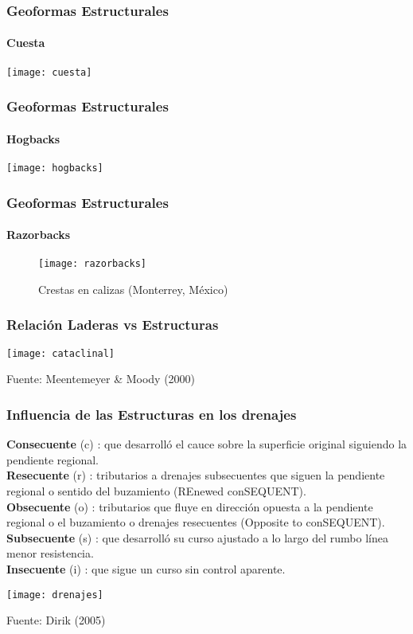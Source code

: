 \documentclass{beamer}
\begin{document}
\begin{frame}
\frametitle{Geoformas Estructurales}
\framesubtitle{Cuesta}
\begin{center}
\texttt{[image: cuesta]}
\end{center}
\end{frame}
\begin{frame}
\frametitle{Geoformas Estructurales}
\framesubtitle{Hogbacks}
\begin{center}
\texttt{[image: hogbacks]}
\end{center}
\end{frame}
\begin{frame}
\frametitle{Geoformas Estructurales}
\framesubtitle{Razorbacks}
\begin{figure}
\begin{center}
\texttt{[image: razorbacks]}
\caption{Crestas en calizas (Monterrey, México)}
\end{center}
\end{figure}
\end{frame}
\begin{frame}
\frametitle{Relación Laderas vs Estructuras}
\begin{center}
\texttt{[image: cataclinal]}
\end{center}
\tiny{Fuente: Meentemeyer \& Moody (2000)}
\end{frame}
\begin{frame}
\frametitle{Influencia de las Estructuras en los drenajes}
\small{
\textbf{Consecuente} (c) : que desarrolló el cauce sobre la superficie original siguiendo la pendiente regional.\\
\textbf{Resecuente} (r) : tributarios a drenajes subsecuentes que siguen la pendiente regional o sentido del buzamiento (REnewed conSEQUENT).\\
\textbf{Obsecuente} (o) : tributarios que fluye en dirección opuesta a la pendiente regional o el buzamiento o drenajes resecuentes (Opposite to conSEQUENT).\\
\textbf{Subsecuente} (s) : que desarrolló su curso ajustado a lo largo del rumbo línea menor resistencia.\\
\textbf{Insecuente} (i) : que sigue un curso sin control aparente.
}
\begin{center}
\texttt{[image: drenajes]}
\end{center}
\tiny{Fuente: Dirik (2005)}
\end{frame}
\end{document}
